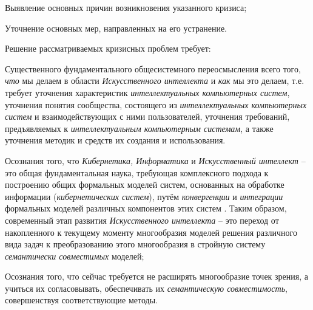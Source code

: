 \begin{textitemize}
	\item
	Выявление основных причин возникновения указанного кризиса;
	\item
	Уточнение основных мер, направленных на его устранение.
\end{textitemize}

Решение рассматриваемых кризисных проблем требует:

\begin{textitemize}
	\item
	Существенного фундаментального общесистемного переосмысления всего того, \textit{что} мы делаем в области \textit{Искусственного интеллекта} и \textit{как} мы это делаем, т.е. требует уточнения характеристик \textit{интеллектуальных компьютерных систем}, уточнения понятия сообщества, состоящего из \textit{интеллектуальных компьютерных систем} и взаимодействующих с ними пользователей, уточнения требований, предъявляемых к \textit{интеллектуальным компьютерным системам}, а также уточнения методик и средств их создания и использования.
	\item
	Осознания того, что \textit{Кибернетика, Информатика} и \textit{Искусственный интеллект} -- это общая фундаментальная наука, требующая комплексного подхода к построению общих формальных моделей систем, основанных на обработке информации (\textit{кибернетических систем}), путём \textit{конвергенции} и \textit{интеграции} формальных моделей различных компонентов этих систем . Таким образом, современный этап развития \textit{Искусственного интеллекта} -- это переход от накопленного к текущему моменту многообразия моделей решения различного вида задач к преобразованию этого многообразия в стройную систему \textit{семантически совместимых} моделей;
	\item
	Осознания того, что сейчас требуется не расширять многообразие точек зрения, а учиться их согласовывать, обеспечивать их \textit{семантическую совместимость}, совершенствуя соответствующие методы.
\end{textitemize}

